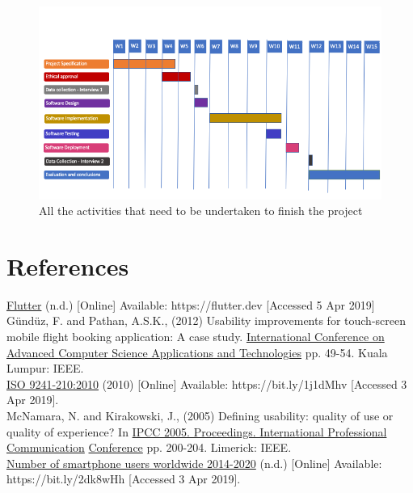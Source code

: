 \documentclass[version=last,fontsize=13pt]{scrartcl}
\begin{document}
	\begin{figure}[H]

		\includegraphics[scale = 0.5]{./imgs/ganttChart}
		\caption{All the activities that need to be undertaken to finish the project}
		\label{gC}

	\end{figure}

\pagebreak
\section*{References}

\underline{Flutter} (n.d.) [Online] Available: https://flutter.dev [Accessed 5 Apr 2019]\\

Gündüz, F. and Pathan, A.S.K., (2012) Usability improvements for touch-screen mobile flight booking application: A case study.  \underline{International Conference on Advanced } \underline{Computer Science Applications and Technologies}  pp. 49-54. Kuala Lumpur: IEEE.\\

\underline{ISO 9241-210:2010} (2010) [Online] Available: https://bit.ly/1j1dMhv [Accessed 3 Apr 2019].\\

McNamara, N. and Kirakowski, J., (2005)  Defining usability: quality of use or quality of experience? In \underline{IPCC 2005. Proceedings. International Professional Communication} \underline{Conference} pp. 200-204. Limerick: IEEE.\\

\underline{Number of smartphone users worldwide 2014-2020} (n.d.) [Online]  Available:\\ https://bit.ly/2dk8wHh [Accessed 3 Apr 2019].\\
\end{document}
